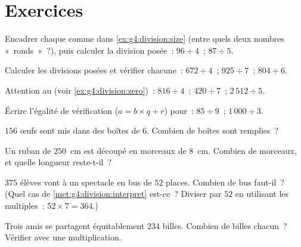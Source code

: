 \section{Exercices}

\begin{exercise}[$\star$]\label{exo:g4:division:1}
Encadrer chaque  comme dans \cref{ex:g4:division:size}
(entre quels deux nombres «~ronds~»~?), puis calculer la division
posée~: $96 \div 4$~; \quad $87 \div 5$.
\end{exercise}

\begin{exercise}[$\star$]\label{exo:g4:division:2}
Calculer les divisions posées et vérifier chacune~:
$672 \div 4$~; \quad $925 \div 7$~; \quad $804 \div 6$.
\end{exercise}

\begin{exercise}[$\star$]\label{exo:g4:division:3}
Attention au  (voir \cref{ex:g4:division:zero})~:
$816 \div 4$~; \quad $420 \div 7$~; \quad $2\,512 \div 5$.
\end{exercise}

\begin{exercise}[$\star$]\label{exo:g4:division:4}
Écrire l'égalité de vérification ($a = b \times q + r$) pour~:
$85 \div 9$~; \quad $1\,000 \div 3$.
\end{exercise}

\begin{exercise}[$\star$]\label{exo:g4:division:5}
$156$ œufs sont mis dans des boîtes de $6$. Combien de boîtes sont
remplies~?
\end{exercise}

\begin{exercise}[$\star$]\label{exo:g4:division:6}
Un ruban de $250$~cm est découpé en morceaux de $8$~cm. Combien de
morceaux, et quelle longueur reste-t-il~?
\end{exercise}

\begin{exercise}[$\star$]\label{exo:g4:division:7}
$375$ élèves vont à un spectacle en bus de $52$ places. Combien de
bus faut-il~? (Quel cas de \cref{met:g4:division:interpret} est-ce~?
Diviser par $52$ en utilisant les multiples~:
$52 \times 7 = 364$.)
\end{exercise}

\begin{exercise}[$\star$]\label{exo:g4:division:8}
Trois amis se partagent équitablement $234$ billes. Combien de
billes chacun~? Vérifier avec une multiplication.
\end{exercise}

